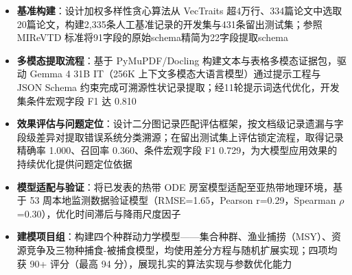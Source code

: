 \documentclass{my-resume}
\begin{document}
\begin{itemize}[parsep=0.2ex]
  \item \textbf{基准构建}：设计加权多样性贪心算法从 VecTraits 超4万行、334篇论文中选取20篇论文，构建2,335条人工基准记录的开发集与431条留出测试集；参照 MIReVTD 标准将91字段的原始schema精简为22字段提取schema
  \item \textbf{多模态提取流程}：基于 PyMuPDF/Docling 构建文本与表格多模态证据包，驱动 Gemma 4 31B IT（256K 上下文多模态大语言模型）通过提示工程与 JSON Schema 约束完成可溯源性状记录提取；经11轮提示词迭代优化，开发集条件宏观字段 F1 达 0.810
  \item \textbf{效果评估与问题定位}：设计二分图记录匹配评估框架，按文档级记录遗漏与字段级差异对提取错误系统分类溯源；在留出测试集上评估锁定流程，取得记录精确率 1.000、召回率 0.360、条件宏观字段 F1 0.729，为大模型应用效果的持续优化提供问题定位依据
\end{itemize}

\begin{itemize}[parsep=0.2ex]
  \item \textbf{模型适配与验证}：将已发表的热带 ODE 房室模型适配至亚热带地理环境，基于 53 周本地监测数据验证模型（RMSE=1.65，Pearson r=0.29，Spearman $\rho$=0.30），优化时间滞后与降雨尺度因子
\end{itemize}

\begin{itemize}[parsep=0.2ex]
  \item \textbf{建模项目组}：构建四个种群动力学模型——集合种群、渔业捕捞（MSY）、资源竞争及三物种捕食-被捕食模型，均使用差分方程与随机扩展实现；四项均获 90+ 评分（最高 94 分），展现扎实的算法实现与参数优化能力
\end{itemize}
\end{document}
